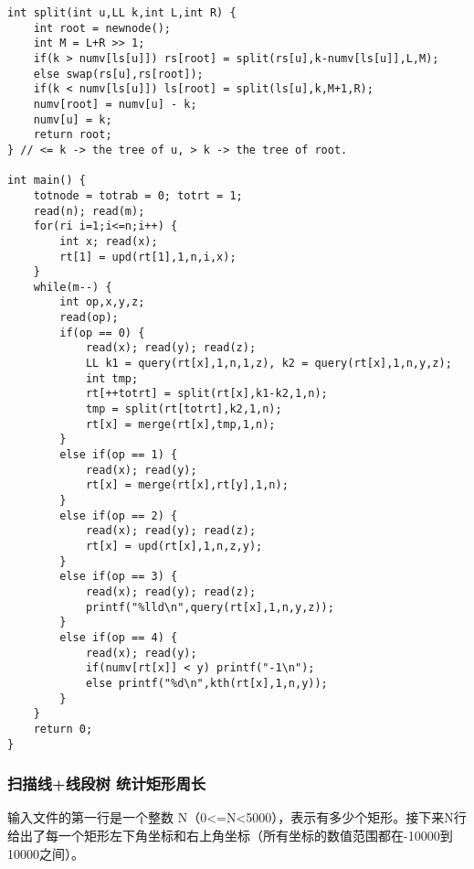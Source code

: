 \documentclass[UTF8]{ctexart}
\begin{document}
\begin{framed}
\begin{lstlisting}
int split(int u,LL k,int L,int R) {
    int root = newnode();
    int M = L+R >> 1;
    if(k > numv[ls[u]]) rs[root] = split(rs[u],k-numv[ls[u]],L,M);
    else swap(rs[u],rs[root]);
    if(k < numv[ls[u]]) ls[root] = split(ls[u],k,M+1,R);
    numv[root] = numv[u] - k;
    numv[u] = k;
    return root;
} // <= k -> the tree of u, > k -> the tree of root.

int main() {
    totnode = totrab = 0; totrt = 1;
    read(n); read(m);
    for(ri i=1;i<=n;i++) {
        int x; read(x);
        rt[1] = upd(rt[1],1,n,i,x);
    }
    while(m--) {
        int op,x,y,z;
        read(op);
        if(op == 0) {
            read(x); read(y); read(z);
            LL k1 = query(rt[x],1,n,1,z), k2 = query(rt[x],1,n,y,z);
            int tmp;
            rt[++totrt] = split(rt[x],k1-k2,1,n);
            tmp = split(rt[totrt],k2,1,n);
            rt[x] = merge(rt[x],tmp,1,n);
        }
        else if(op == 1) {
            read(x); read(y);
            rt[x] = merge(rt[x],rt[y],1,n);
        }
        else if(op == 2) {
            read(x); read(y); read(z);
            rt[x] = upd(rt[x],1,n,z,y);
        }
        else if(op == 3) {
            read(x); read(y); read(z);
            printf("%lld\n",query(rt[x],1,n,y,z));
        }
        else if(op == 4) {
            read(x); read(y);
            if(numv[rt[x]] < y) printf("-1\n"); 
            else printf("%d\n",kth(rt[x],1,n,y));
        }
    }
    return 0;
} 
\end{lstlisting}
\end{framed}

\subsubsection{扫描线+线段树 统计矩形周长}
输入文件的第一行是一个整数 N（0<=N<5000），表示有多少个矩形。接下来N行给出了每一个矩形左下角坐标和右上角坐标（所有坐标的数值范围都在-10000到10000之间）。
\end{document}
